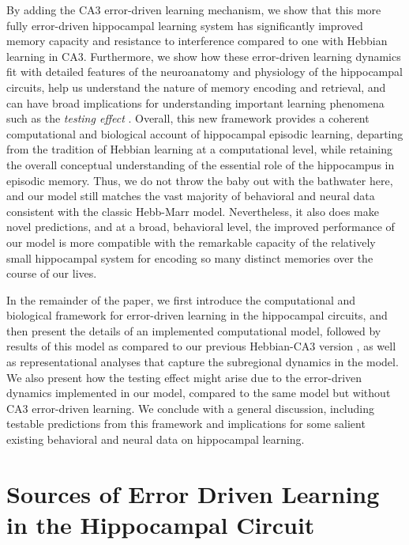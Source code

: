 \documentclass[11pt,twoside]{article}
\newif\myifpdf
\begin{document}
By adding the CA3 error-driven learning mechanism, we show that this more fully error-driven hippocampal learning system has significantly improved memory capacity and resistance to interference compared to one with Hebbian learning in CA3.  Furthermore, we show how these error-driven learning dynamics fit with detailed features of the neuroanatomy and physiology of the hippocampal circuits, help us understand the nature of memory encoding and retrieval, and can have broad implications for understanding important learning phenomena such as the \emph{testing effect} \citep{LiuOReillyRanganath21}.  Overall, this new framework provides a coherent computational and biological account of hippocampal episodic learning, departing from the tradition of Hebbian learning at a computational level, while retaining the overall conceptual understanding of the essential role of the hippocampus in episodic memory.  Thus, we do not throw the baby out with the bathwater here, and our model still matches the vast majority of behavioral and neural data consistent with the classic Hebb-Marr model.  Nevertheless, it also does make novel predictions, and at a broad, behavioral level, the improved performance of our model is more compatible with the remarkable capacity of the relatively small hippocampal system for encoding so many distinct memories over the course of our lives.

In the remainder of the paper, we first introduce the computational and biological framework for error-driven learning in the hippocampal circuits, and then present the details of an implemented computational model, followed by results of this model as compared to our previous Hebbian-CA3 version \citep{KetzMorkondaOReilly13}, as well as representational analyses that capture the subregional dynamics in the model.  We also present how the testing effect might arise due to the error-driven dynamics implemented in our model, compared to the same model but without CA3 error-driven learning.  We conclude with a general discussion, including testable predictions from this framework and implications for some salient existing behavioral and neural data on hippocampal learning.

\section{Sources of Error Driven Learning in the Hippocampal Circuit}
\end{document}
